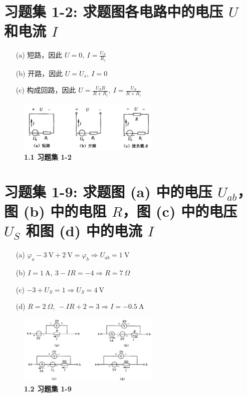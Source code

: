 \documentclass[UTF8]{report}
\theoremstyle{MyLineTheoremStyle} %
\theoremstyle{MyBlockTheoremStyle} %
\theoremstyle{MySubsubsectionStyle} %
\begin{document}
\section{习题集 1-2: 求题图各电路中的电压 $U$ 和电流 $I$}

\begin{enumerate}
\item[(a)] 短路，因此 $U = 0,\  I = \frac{U_S}{R_i}$
\item[(b)] 开路，因此 $U = U_s, \ I = 0$
\item[(c)] 构成回路，因此  $ U = \frac{U_SR}{R + R_i},\ I = \frac{U_S}{R + R_i}$ 
\end{enumerate}

\begin{figure}[H]\centering
\includegraphics[width=0.6\textwidth]{assets/1/ae1cfc03fad5c98bfff08a663714a004.png}
\caption{\bfseries 1.1 习题集 1-2}
\end{figure}

\section{习题集 1-9: 求题图 (a) 中的电压 $U_{ab}$，图 (b) 中的电阻 $R$，图 (c) 中的电压 $U_S$ 和图 (d) 中的电流 $I$}

\begin{enumerate}
    \item[(a)]  $ \varphi_a - 3\ \mathrm{V} + 2\ \mathrm{V} = \varphi_b \Longrightarrow U_{ab} = 1\ \mathrm{V} $ 
    \item[(b)] $I = 1\ \mathrm{A},\  3 -IR= -4 \Longrightarrow R = 7\ \Omega$ 
    \item[(c)] $-3 + U_S = 1 \Longrightarrow U_S = 4 \ \mathrm{V}$ 
    \item[(d)] $R=2\ \Omega,\ -IR + 2 = 3 \Longrightarrow I = -0.5\ \mathrm{A}$ 
\end{enumerate}

\begin{figure}[H]\centering
    \includegraphics[width=0.6\textwidth]{assets/1/d3d69ecd6b1c1bc476fd4a4957fb9e56.png}
\caption{\bfseries 1.2 习题集 1-9}
\end{figure}
\end{document}
